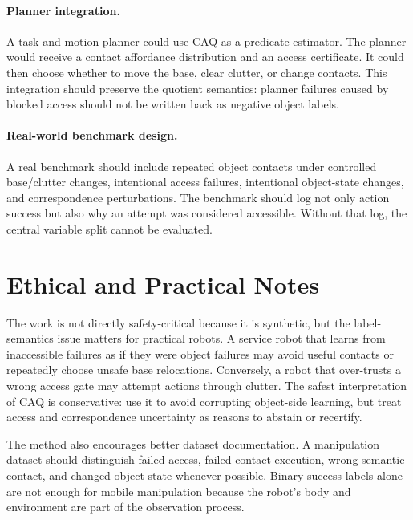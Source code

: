 \documentclass{article}
\begin{document}
\paragraph{Planner integration.}
A task-and-motion planner could use CAQ as a predicate estimator. The planner would receive a contact affordance distribution and an access certificate. It could then choose whether to move the base, clear clutter, or change contacts. This integration should preserve the quotient semantics: planner failures caused by blocked access should not be written back as negative object labels.

\paragraph{Real-world benchmark design.}
A real benchmark should include repeated object contacts under controlled base/clutter changes, intentional access failures, intentional object-state changes, and correspondence perturbations. The benchmark should log not only action success but also why an attempt was considered accessible. Without that log, the central variable split cannot be evaluated.

\section{Ethical and Practical Notes}

The work is not directly safety-critical because it is synthetic, but the label-semantics issue matters for practical robots. A service robot that learns from inaccessible failures as if they were object failures may avoid useful contacts or repeatedly choose unsafe base relocations. Conversely, a robot that over-trusts a wrong access gate may attempt actions through clutter. The safest interpretation of CAQ is conservative: use it to avoid corrupting object-side learning, but treat access and correspondence uncertainty as reasons to abstain or recertify.

The method also encourages better dataset documentation. A manipulation dataset should distinguish failed access, failed contact execution, wrong semantic contact, and changed object state whenever possible. Binary success labels alone are not enough for mobile manipulation because the robot's body and environment are part of the observation process.
\end{document}
